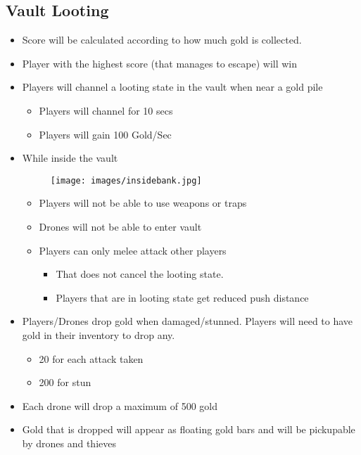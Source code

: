 \documentclass[10pt]{report}
\begin{document}
\subsection{Vault Looting}

\begin{itemize}
    \item Score will be calculated according to how much gold is collected.
    \item Player with the highest score (that manages to escape) will win
    \item Players will channel a looting state in the vault when near a gold pile 
    \begin{itemize}
        \item Players will channel for 10 secs
        \item Players will gain 100 Gold/Sec
    \end{itemize}
    \item While inside the vault
    \begin{figure}[H]
        \centering
        \texttt{[image: images/insidebank.jpg]}
    \end{figure}
    \begin{itemize}
        \item Players will not be able to use weapons or traps
        \item Drones will not be able to enter vault
        \item Players can only melee attack other players 
        \begin{itemize}
            \item That does not cancel the looting state.
            \item Players that are in looting state get reduced push distance
        \end{itemize}
    \end{itemize}
    \item Players/Drones drop gold when damaged/stunned. Players will need to have gold in their inventory to drop any.
    \begin{itemize}
        \item 20  for each attack taken
        \item 200 for stun
    \end{itemize}
    \item Each drone will drop a maximum of 500 gold
    \item Gold that is dropped will appear as floating gold bars and will be pickupable by drones and thieves     
\end{itemize}
\end{document}
